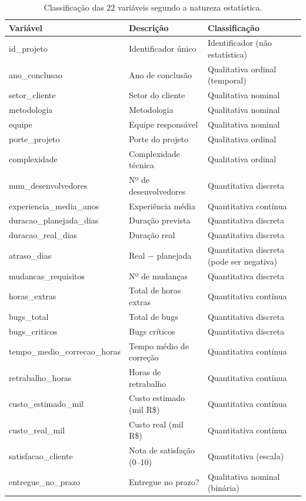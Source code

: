\documentclass[a4paper, 12pt]{article}
\begin{document}
\begin{table}[H]
\centering
\caption{Classificação das 22 variáveis segundo a natureza estatística.}
\label{tab:classificacao}
\footnotesize
\begin{tabularx}{\textwidth}{@{} >{\ttfamily\footnotesize}l L L @{}}
\toprule
\normalfont\textbf{Variável} & \textbf{Descrição} & \textbf{Classificação} \\
\midrule
id\_projeto                 & Identificador único        & Identificador (não estatística) \\
ano\_conclusao              & Ano de conclusão           & Qualitativa ordinal (temporal) \\
setor\_cliente              & Setor do cliente           & Qualitativa nominal \\
metodologia                 & Metodologia                & Qualitativa nominal \\
equipe                      & Equipe responsável         & Qualitativa nominal \\
porte\_projeto              & Porte do projeto           & Qualitativa ordinal \\
complexidade                & Complexidade técnica       & Qualitativa ordinal \\
num\_desenvolvedores        & Nº de desenvolvedores      & Quantitativa discreta \\
experiencia\_media\_anos    & Experiência média          & Quantitativa contínua \\
duracao\_planejada\_dias    & Duração prevista           & Quantitativa discreta \\
duracao\_real\_dias         & Duração real               & Quantitativa discreta \\
atraso\_dias                & Real $-$ planejada         & Quantitativa discreta (pode ser negativa) \\
mudancas\_requisitos        & Nº de mudanças             & Quantitativa discreta \\
horas\_extras               & Total de horas extras      & Quantitativa contínua \\
bugs\_total                 & Total de bugs              & Quantitativa discreta \\
bugs\_criticos              & Bugs críticos              & Quantitativa discreta \\
tempo\_medio\_correcao\_horas & Tempo médio de correção  & Quantitativa contínua \\
retrabalho\_horas           & Horas de retrabalho        & Quantitativa contínua \\
custo\_estimado\_mil        & Custo estimado (mil R\$)   & Quantitativa contínua \\
custo\_real\_mil            & Custo real (mil R\$)       & Quantitativa contínua \\
satisfacao\_cliente         & Nota de satisfação (0--10) & Quantitativa (escala) \\
entregue\_no\_prazo         & Entregue no prazo?         & Qualitativa nominal (binária) \\
\bottomrule
\end{tabularx}
\end{table}
\end{document}
